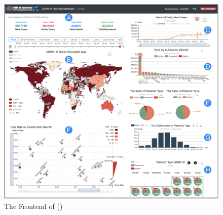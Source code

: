 


\begin{figure}[t!]
	\centering
	\includegraphics[width=.95\columnwidth]{figs/frontend.pdf}
	\vspace{-1em}
	\caption{The Frontend of \sys ()}
	\label{fig:frontend}
	\vspace{-1em}
\end{figure}





